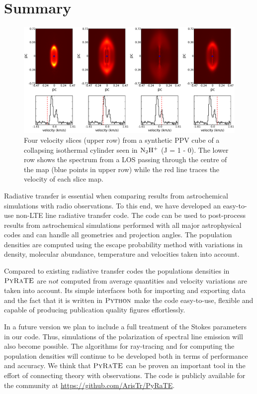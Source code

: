 \documentclass{mn2e}
\begin{document}
\section{Summary}\label{discuss}
\begin{figure}
\includegraphics[width=2.0\columnwidth, clip]{velocity_slices_cylrl.eps}
\caption{Four velocity slices (upper row) from a synthetic PPV cube of a collapsing isothermal cylinder seen in $\rm{N_2H^{+}}$ (J = 1 - 0). The lower row shows the spectrum from a LOS passing through the centre of the map (blue points in upper row) while the red line traces the velocity of each slice map.
\label{cyl_iso_collapse}}
\end{figure}

Radiative transfer is essential when comparing results from astrochemical simulations with radio observations. To this end, we have developed an easy-to-use non-LTE line radiative transfer code. The code can be used to post-process results from astrochemical simulations performed with all major astrophysical codes and can handle all geometries and projection angles. The population densities are computed using the escape probability method with variations in density, molecular abundance, temperature and velocities taken into account. 

Compared to existing radiative transfer codes the populations densities in $\textsc{PyRaTE}$ are $\textit{not}$ computed from average quantities and velocity variations are taken into account. Its simple interfaces both for importing and exporting data and the fact that it is written in $\textsc{Python}$ make the code easy-to-use, flexible and capable of producing publication quality figures effortlessly.

In a future version we plan to include a full treatment of the Stokes parameters in our code. Thus, simulations of the polarization of spectral line emission will also become possible. The algorithms for ray-tracing and for computing the population densities will continue to be developed both in terms of performance and accuracy. We think that $\textsc{PyRaTE}$ can be proven an important tool in the effort of connecting theory with observations. The code is publicly available for the community at \url{https://github.com/ArisTr/PyRaTE}.
\end{document}
